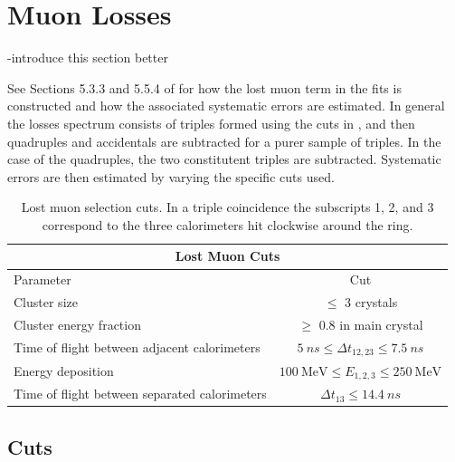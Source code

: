 
\graphicspath{{Body/Figures/MuonLosses/}}

\section{Muon Losses}

-introduce this section better

See Sections 5.3.3 and 5.5.4 of  for how the lost muon term in the fits is constructed and how the associated systematic errors are estimated. In general the losses spectrum consists of triples formed using the cuts in , and then quadruples and accidentals are subtracted for a purer sample of triples. In the case of the quadruples, the two constitutent triples are subtracted. Systematic errors are then estimated by varying the specific cuts used.


\begin{table}[h]
\centering
\setlength\tabcolsep{10pt}
\renewcommand{\arraystretch}{1.2}
\begin{tabular*}{1\linewidth}{@{\extracolsep{\fill}}lc}
  \hline
    \multicolumn{2}{c}{\textbf{Lost Muon Cuts}} \\
  \hline\hline
    Parameter & Cut \\
  \hline
    Cluster size & $\leq$ 3 crystals \\
    Cluster energy fraction & $\geq$ 0.8 in main crystal \\
    Time of flight between adjacent calorimeters & $\SI{5}{ns} \leq \Delta t_{12, 23} \leq \SI{7.5}{ns}$ \\
    Energy deposition & $\SI{100}{\MeV} \leq E_{1,2,3} \leq \SI{250}{\MeV}$ \\
    Time of flight between separated calorimeters & $\Delta t_{13} \leq \SI{14.4}{ns}$ \\
  \hline 
\end{tabular*}
\caption[Lost muon cuts]{Lost muon selection cuts. In a triple coincidence the subscripts 1, 2, and 3 correspond to the three calorimeters hit clockwise around the ring.}
\label{tab:lostmuoncuts}
\end{table}



\subsection{Cuts}

